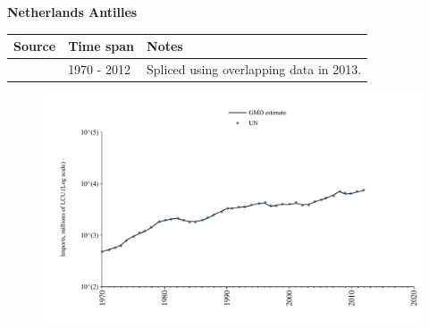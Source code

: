 \documentclass[12pt,a4paper,landscape]{article}
\begin{document}
\begin{adjustbox}{max totalsize={\paperwidth}{\paperheight},center}
\begin{minipage}[t][\textheight][t]{\textwidth}
\vspace*{0.5cm}
{}
\begin{center}
{\Large\bfseries Netherlands Antilles}
\end{center}
\vspace{0.5cm}
\begin{table}[H]
\centering
\small
\begin{tabular}{|l|l|l|}
\hline
\textbf{Source} & \textbf{Time span} & \textbf{Notes} \\
\hline
\rowcolor{white}\cite{UN}& 1970 - 2012 &Spliced using overlapping data in 2013.\\
\hline
\end{tabular}
\end{table}
\begin{figure}[H]
\centering
\includegraphics[width=\textwidth,height=0.6\textheight,keepaspectratio]{graphs/ANT_imports.pdf}
\end{figure}
\end{minipage}
\end{adjustbox}
\end{document}
